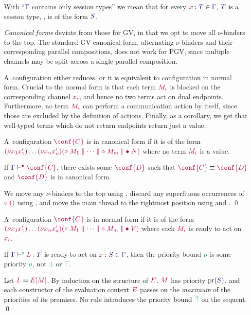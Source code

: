 With ``$\ty{\Gamma}$ contains only session types'' we mean that for every $\tmty{x}{T}\in\ty{\Gamma}$, $\ty{T}$ is a session type, \ie, is of the form $\ty{S}$.

\emph{Canonical forms} deviate from those for GV, in that we opt to move all $\nu$-binders to the top. The standard GV canonical form, alternating $\nu$-binders and their corresponding parallel compositions, does not work for PGV, since multiple channels may be split across a single parallel composition.

A~configuration either reduces, or it is equivalent to configuration in normal form. Crucial to the normal form is that each term $\tm{M_i}$ is blocked on the corresponding channel $\tm{x_i}$, and hence no two terms act on dual endpoints. Furthermore, no term $\tm{M_i}$ can perform a communication action by itself, since those are excluded by the definition of actions.
Finally, as a corollary, we get that well-typed terms which do not return endpoints return {just} a value:

\begin{defi}\label{def:pgv-canonical-forms}
  A~configuration $\tm{\conf{C}}$ is in canonical form if it is of the form
  $\tm{\res{x_1}{x'_1}{\dots\res{x_n}{x'_n}{(\child\;M_1\parallel\dots\parallel\child\;M_m\parallel\main\;N)}}}$
  where no term $\tm{M_i}$ is a value.
\end{defi}

\begin{lem}\label{lem:pgv-canonical-forms}
  If $\cseq[\main]{\ty{\Gamma}}{\conf{C}}$, there exists some $\tm{\conf{D}}$ such that $\tm{\conf{C}}\equiv\tm{\conf{D}}$ and $\tm{\conf{D}}$ is in canonical form.
\end{lem}
\proof
We move any $\nu$-binders to the top using , discard any superfluous occurrences of $\tm{\child\;\unit}$ using , and move the main thread to the rightmost position using  and .
\qed

\begin{defi}
  A~configuration $\tm{\conf{C}}$ is in normal form if it is of the form
  $\tm{\res{x_1}{x'_1}{\dots\res{x_n}{x'_n}{(\child\;M_1\parallel\dots\parallel\child\;M_m\parallel\main\;V)}}}$
  where each $\tm{M_i}$ is ready to act on $\tm{x_i}$.
\end{defi}

\begin{lem}\label{lem:pgv-ready-priority}
  If $\tseq[\cs{p}]{\ty{\Gamma}}{L}{T}$ is ready to act on $\tmty{x}{S}\in\ty{\Gamma}$, then the priority bound $\cs{p}$ is some priority $\cs{o}$, \ie not $\cs{\pbot}$ or $\cs{\ptop}$.
\end{lem}
\proof
Let $\tm{L}=\tm{\plug{E}{M}}$. By induction on the structure of $\tm{E}$. $\tm{M}$ has priority $\pr({\ty{S}})$, and each constructor of the evaluation context $\tm{E}$ passes on the \emph{maximum} of the priorities of its premises. No rule introduces the priority bound $\cs{\ptop}$ on the sequent.
\qed

